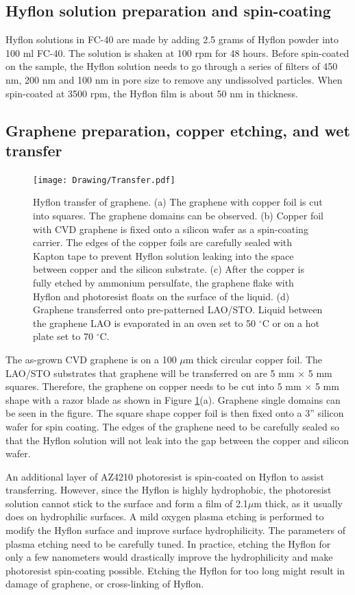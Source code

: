 \documentclass[pdflatex, sectionletters, 12pt, final, phd]{pittetd}    %
\begin{document}
\subsection{Hyflon solution preparation and spin-coating} 

Hyflon solutions in FC-40 are made by adding 2.5 grams of Hyflon powder into 100 ml FC-40. The solution is shaken at 100 rpm for 48 hours. Before spin-coated on the sample, the Hyflon solution needs to go through a series of filters of 450 nm, 200 nm and 100 nm in pore size to remove any undissolved particles. When spin-coated at 3500 rpm, the Hyflon film is about 50 nm in thickness. 

\subsection{Graphene preparation, copper etching, and wet transfer}

\begin{figure}[p]
	\centering
	\texttt{[image: Drawing/Transfer.pdf]}
	\caption[Hyflon transfer of graphene]{Hyflon transfer of graphene. (a) The graphene with copper foil is cut into squares. The graphene domains can be observed. (b) Copper foil with CVD graphene is fixed onto a silicon wafer as a spin-coating carrier. The edges of the copper foils are carefully sealed with Kapton tape to prevent Hyflon solution leaking into the space between copper and the silicon substrate. (c) After the copper is fully etched by ammonium persulfate, the graphene flake with Hyflon and photoresist floats on the surface of the liquid. (d) Graphene transferred onto pre-patterned LAO/STO. Liquid between the graphene LAO is evaporated in an oven set to 50 $^{\circ}$C or on a hot plate set to 70 $^{\circ}$C.}
	\label{FIG:Transfer}
\end{figure}

The as-grown CVD graphene is on a 100 $\mu$m thick circular copper foil. The LAO/STO substrates that graphene will be transferred on are 5 mm $\times$ 5 mm squares. Therefore, the graphene on copper needs to be cut into 5 mm $\times$ 5 mm shape with a razor blade as shown in Figure \ref{FIG:Transfer}(a). Graphene single domains can be seen in the figure. The square shape copper foil is then fixed onto a 3'' silicon wafer for spin coating. The edges of the graphene need to be carefully sealed so that the Hyflon solution will not leak into the gap between the copper and silicon wafer.

An additional layer of AZ4210 photoresist is spin-coated on Hyflon to assist transferring. However, since the Hyflon is highly hydrophobic, the photoresist solution cannot stick to the surface and form a film of 2.1$\mu$m thick, as it usually does on hydrophilic surfaces. A mild oxygen plasma etching is performed to modify the Hyflon surface and improve surface hydrophilicity. The parameters of plasma etching need to be carefully tuned. In practice, etching the Hyflon for only a few nanometers would drastically improve the hydrophilicity and make photoresist spin-coating possible. Etching the Hyflon for too long might result in damage of graphene, or cross-linking of Hyflon.
\end{document}
